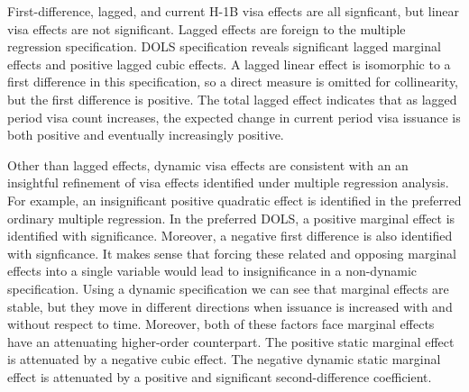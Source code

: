 \documentclass[review]{elsarticle}
\begin{document}

First-difference, lagged, and current H-1B visa effects are all signficant,
but linear visa effects are not significant.
Lagged effects are foreign to the multiple regression specification.
DOLS specification reveals significant lagged marginal effects and positive
lagged cubic effects.
A lagged linear effect is isomorphic to a first difference in this specification,
so a direct measure is omitted for collinearity,
but the first difference is positive.
The total lagged effect indicates that as lagged period visa count increases,
the expected change in current period visa issuance is both positive and eventually increasingly positive.

Other than lagged effects, dynamic visa effects are consistent with an an insightful refinement of
visa effects identified under multiple regression analysis.
For example, an insignificant positive quadratic effect is identified in the preferred ordinary multiple regression.
In the preferred DOLS, a positive marginal effect is identified with significance.
Moreover, a negative first difference is also identified with signficance.
It makes sense that forcing these related and opposing marginal effects into a single variable would lead
to insignificance in a non-dynamic specification.
Using a dynamic specification we can see that marginal effects are stable,
but they move in different directions when issuance is increased with and without respect to time.
Moreover, both of these factors face marginal effects have an attenuating higher-order counterpart.
The positive static marginal effect is attenuated by a negative cubic effect.
The negative dynamic static marginal effect is attenuated by a positive and significant second-difference coefficient.
\end{document}
